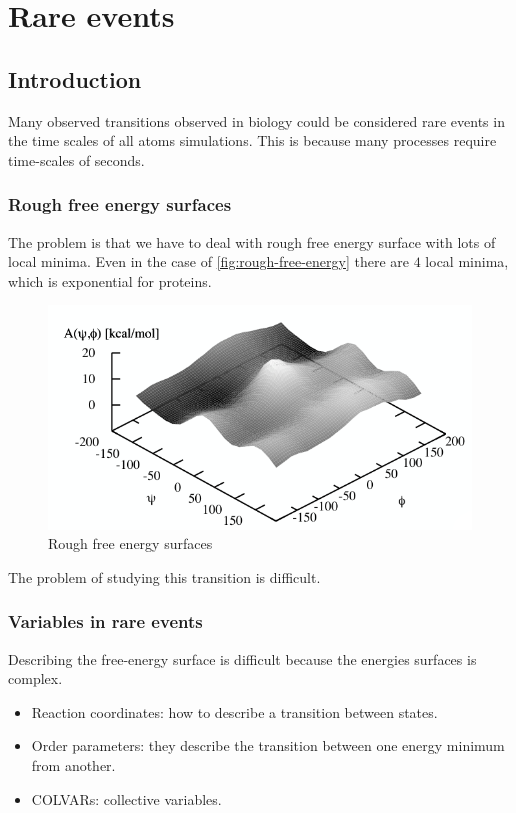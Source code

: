 \graphicspath{{chapters/19/images/}}
\chapter{Rare events}

\section{Introduction}
Many observed transitions observed in biology could be considered rare events in the time scales of all atoms simulations.
This is because many processes require time-scales of seconds.

	\subsection{Rough free energy surfaces}
	The problem is that we have to deal with rough free energy surface with lots of local minima.
	Even in the case of \ref{fig:rough-free-energy} there are $4$ local minima, which is exponential for proteins.

	\begin{figure}[H]
		\includegraphics[width=\textwidth]{rough-free-energy-surfaces}
		\caption{Rough free energy surfaces}
		\label{fig:rough-free-energy-surfaces}
	\end{figure}

	The problem of studying this transition is difficult.

	\subsection{Variables in rare events}
	Describing the free-energy surface is difficult because the energies surfaces is complex.

		\begin{itemize}
			\item Reaction coordinates: how to describe a transition between states.
			\item Order parameters: they describe the transition between one energy minimum from another.
			\item COLVARs: collective variables.
		\end{itemize}

